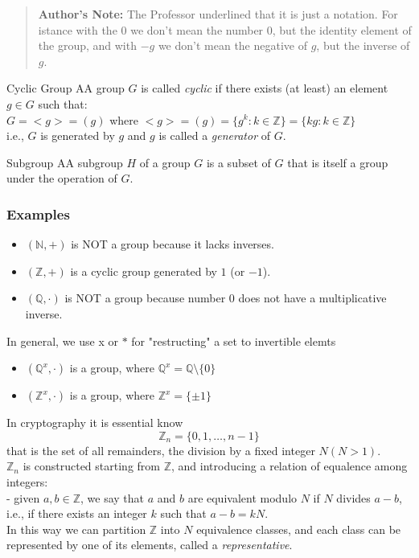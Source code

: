 \begin{quote}
\textbf{Author's Note:} The Professor underlined that it is just a notation. For istance with the $0$ we don't mean the number $0$, but the identity element of the group, and with $-g$ we don't mean the negative of $g$, but the inverse of $g$.
\end{quote}


\begin{defBox}{Cyclic Group}
AA group $G$ is called \textit{cyclic} if there exists (at least) an element $g \in G$ such that:\\
$G = <g> = (g)$ where $<g> = (g) = \{g^k : k \in \mathbb{Z}\} = \{kg : k \in \mathbb{Z}\}$ \\
i.e., $G$ is generated by $g$ and $g$ is called a \textit{generator} of $G$.
\end{defBox}

\medskip

\begin{defBox}{Subgroup}
AA subgroup $H$ of a group $G$ is a subset of $G$ that is itself a group under the operation of $G$.
\end{defBox}

\subsubsection*{Examples}
\begin{itemize}
    \item $(\mathbb{N}, +)$ is NOT a group because it lacks inverses.
    \item $(\mathbb{Z}, +)$ is a cyclic group generated by $1$ (or $-1$).
    \item $(\mathbb{Q}, \cdot)$ is NOT a group because number $0$ does not have a multiplicative inverse.
\end{itemize}
In general, we use x or $*$ for "restructing" a set to invertible elemts
\begin{itemize}
    \item $(\mathbb{Q}^x, \cdot)$ is a group, where $\mathbb{Q}^x = \mathbb{Q} \setminus \{0\}$
    \item $(\mathbb{Z}^x, \cdot)$ is a group, where $\mathbb{Z}^x = \{ \pm 1\}$    
\end{itemize}

\bigskip

\noindent
In cryptography it is essential know $$\mathbb{Z}_n = \{0, 1, \dots, n-1\}$$ that is the set of all remainders, the division by a fixed integer $N (N>1)$.\\
$\mathbb{Z}_n$ is constructed starting from $\mathbb{Z}$, and introducing a relation of equalence among integers:\\
- given $a, b \in \mathbb{Z}$, we say that $a$ and $b$ are equivalent modulo $N$ if $N$ divides $a-b$, i.e., if there exists an integer $k$ such that $a - b = kN$.\\
In this way we can partition $\mathbb{Z}$ into $N$ equivalence classes, and each class can be represented by one of its elements, called a \textit{representative}.

